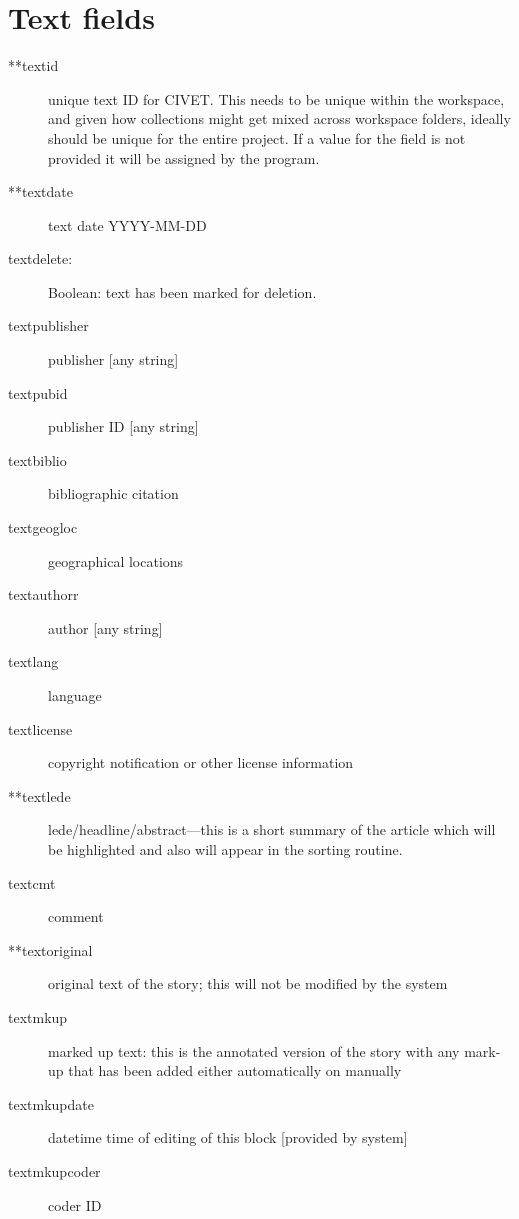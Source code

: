 \documentclass[letterpaper,10pt,english]{sphinxmanual}
\begin{document}
\section{Text fields}
\label{appendix2:text-fields}\begin{description}
\item[{**textid}] \leavevmode
unique text ID for CIVET. This needs to be unique within the
workspace, and given how collections might get mixed across
workspace folders, ideally should be unique for the entire project.
If a value for the  field is not provided it will be
assigned by the program.

\item[{**textdate}] \leavevmode
text date YYYY-MM-DD

\item[{textdelete:}] \leavevmode
Boolean: text has been marked for deletion.

\item[{textpublisher}] \leavevmode
publisher {[}any string{]}

\item[{textpubid}] \leavevmode
publisher ID {[}any string{]}

\item[{textbiblio}] \leavevmode
bibliographic citation

\item[{textgeogloc}] \leavevmode
geographical locations

\item[{textauthorr}] \leavevmode
author {[}any string{]}

\item[{textlang}] \leavevmode
language

\item[{textlicense}] \leavevmode
copyright notification or other license information

\item[{**textlede}] \leavevmode
lede/headline/abstract—this is a short summary of the article
which will be highlighted and also will appear in the sorting
routine.

\item[{textcmt}] \leavevmode
comment

\item[{**textoriginal}] \leavevmode
original text of the story; this will not be modified by the system

\item[{textmkup}] \leavevmode
marked up text: this is the annotated version of the story with
any mark-up that has been added either automatically on manually

\item[{textmkupdate}] \leavevmode
datetime time of editing of this block {[}provided by system{]}

\item[{textmkupcoder}] \leavevmode
coder ID

\end{description}
\end{document}
